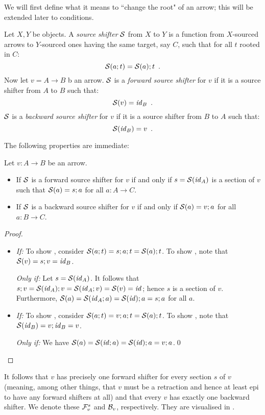 We will first define what it means to ``change the root" of an arrow; this will be extended later to conditions.
%
\begin{definition}
Let $X,Y$ be objects. A \emph{source shifter} $\mathcal{S}$ from $X$ to $Y$ is a function from $X$-sourced arrows to $Y$-sourced ones having the same target, say $C$, such that for all $t$ rooted in $C$:
%
\begin{equation}\eqlabel{shifters are functors}
\cS(a;t) = \cS(a);t \enspace.
\end{equation}
%
Now let $v=A\to B$ b an arrow. $\mathcal{S}$ is a \emph{forward source shifter} for $v$ if it is a source shifter from $A$ to $B$ such that:
%
\begin{equation}\eqlabel{forward condition}
\cS(v) = \id_B \enspace.
\end{equation}
%
$\mathcal{S}$ is a \emph{backward source shifter} for $v$ if it is a source shifter from $B$ to $A$ such that:
%
\begin{equation}\eqlabel{backward condition}
\cS(\id_B) = v \enspace.
\end{equation}
\end{definition}
%
The following properties are immediate:
%
\begin{proposition}
Let $v:A\to B$ be an arrow.
\begin{itemize}
\item If $\mathcal{S}$ is a forward source shifter for $v$ if and only if $s=\mathcal{S}(\mathit{id}_A)$ is a section of $v$ such that $\mathcal{S}(a)=s;a$ for all $a:A\to C$.
\item If $\mathcal{S}$ is a backward source shifter for $v$ if and only if $\mathcal{S}(a)=v;a$ for all $a:B\to C$.
\end{itemize}
\end{proposition}
%
\begin{proof}~
\begin{itemize}
\item \textit{If:} To show , consider $\mathcal{S}(a;t)=s;a;t=\mathcal{S}(a);t$. To show , note that $\mathcal{S}(v)=s;v=\mathit{id}_B$.

\smallskip
\textit{Only if:} Let $s=\mathcal{S}(\mathit{id}_A)$. It follows that $s;v=\mathcal{S}(\mathit{id}_A);v=\mathcal{S}(\mathit{id}_A;v)=\mathcal{S}(v)=\mathit{id}$; hence $s$ is a section of $v$. Furthermore, $\mathcal{S}(a)=\mathcal{S}(\mathit{id}_A;a)=\mathcal{S}(\mathit{id});a=s;a$ for all $a$.

\item \textit{If:} To show , consider $\mathcal{S}(a;t)=v;a;t=\mathcal{S}(a);t$. To show , note that $\mathcal{S}(\mathit{id}_B)=v;\mathit{id}_B=v$.

\smallskip
\textit{Only if:} We have $\mathcal{S}(a)=\mathcal{S}(\mathit{id};a)=\mathcal{S}(\mathit{id});a=v;a$.\qed
\end{itemize}
\end{proof}
%
It follows that $v$ has precisely one forward shifter for every section $s$ of $v$ (meaning, among other things, that $v$ must be a retraction and hence at least epi to have any forward shifters at all) and that every $v$ has exactly one backward shifter. We denote these $\mathcal{F}_v^s$ and $\mathcal{B}_v$, respectively. They are visualised in .

